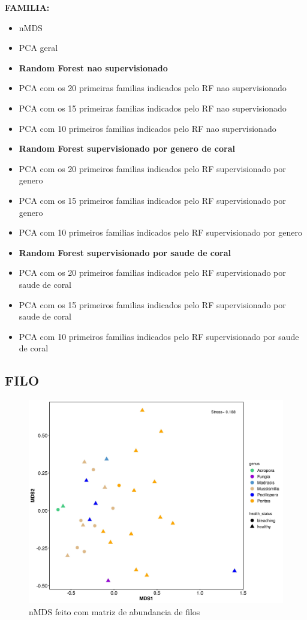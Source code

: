 \documentclass[12pt, a4paper]{report}
\begin{document}
\textbf{FAMILIA:}
\begin{itemize}
\item nMDS 
\item PCA geral
\item \textbf{Random Forest nao supervisionado}
\item PCA com os 20 primeiras familias indicados pelo RF nao supervisionado
\item PCA com os 15 primeiras familias  indicados pelo RF nao supervisionado
\item PCA com 10 primeiros familias indicados pelo RF nao supervisionado
\item \textbf{Random Forest supervisionado por genero de coral}
\item PCA com os 20 primeiros familias  indicados pelo RF supervisionado por genero
\item PCA com os 15 primeiros familias  indicados pelo RF supervisionado por genero
\item PCA com 10 primeiros familias  indicados pelo RF supervisionado por genero
\item \textbf{Random Forest supervisionado por saude de coral}
\item PCA com os 20 primeiros familias  indicados pelo RF supervisionado por saude de coral
\item PCA com os 15 primeiros familias  indicados pelo RF supervisionado por saude de coral
\item PCA com 10 primeiros familias  indicados pelo RF supervisionado por saude de coral
\end{itemize}

\subsection{FILO}
\begin{figure}[H]
\centering
\includegraphics[scale=0.4]{figures/filos/nMDS_filos_corais_2018_10_30.jpg}
\caption{nMDS feito com matriz de abundancia de filos}
\label{fig:nMDSfeito30deoutubro}
\end{figure}
\end{document}
